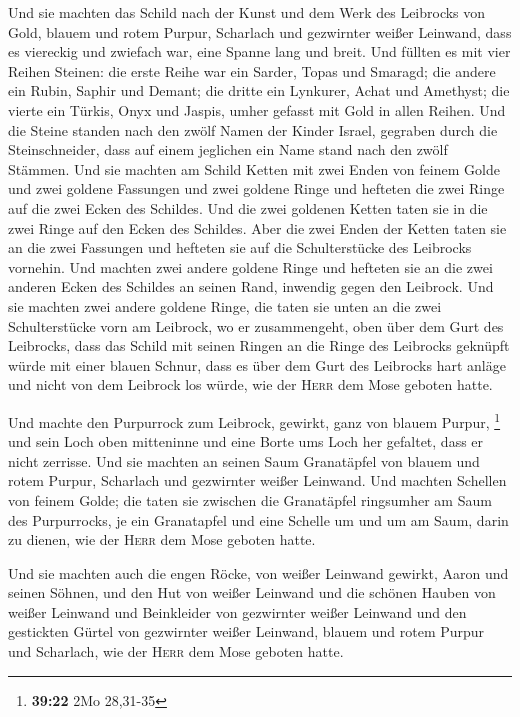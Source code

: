  Und sie machten das Schild nach der Kunst und dem Werk
des Leibrocks von Gold, blauem und rotem Purpur, Scharlach und
gezwirnter weißer Leinwand,  dass es viereckig und
zwiefach war, eine Spanne lang und breit.  Und füllten es
mit vier Reihen Steinen: die erste Reihe war ein Sarder, Topas und
Smaragd;  die andere ein Rubin, Saphir und Demant;
 die dritte ein Lynkurer, Achat und Amethyst;
 die vierte ein Türkis, Onyx und Jaspis, umher gefasst
mit Gold in allen Reihen.  Und die Steine standen nach
den zwölf Namen der Kinder Israel, gegraben durch die Steinschneider,
dass auf einem jeglichen ein Name stand nach den zwölf Stämmen.
 Und sie machten am Schild Ketten mit zwei Enden von
feinem Golde  und zwei goldene Fassungen und zwei goldene
Ringe und hefteten die zwei Ringe auf die zwei Ecken des Schildes.
 Und die zwei goldenen Ketten taten sie in die zwei Ringe
auf den Ecken des Schildes.  Aber die zwei Enden der
Ketten taten sie an die zwei Fassungen und hefteten sie auf die
Schulterstücke des Leibrocks vornehin.  Und machten zwei
andere goldene Ringe und hefteten sie an die zwei anderen Ecken des
Schildes an seinen Rand, inwendig gegen den Leibrock. 
Und sie machten zwei andere goldene Ringe, die taten sie unten an die
zwei Schulterstücke vorn am Leibrock, wo er zusammengeht, oben über dem
Gurt des Leibrocks,  dass das Schild mit seinen Ringen an
die Ringe des Leibrocks geknüpft würde mit einer blauen Schnur, dass es
über dem Gurt des Leibrocks hart anläge und nicht von dem Leibrock los
würde, wie der \textsc{Herr} dem Mose geboten hatte.

 Und machte den Purpurrock zum Leibrock, gewirkt, ganz
von blauem Purpur, \footnote{\textbf{39:22} 2Mo 28,31-35}
 und sein Loch oben mitteninne und eine Borte ums Loch
her gefaltet, dass er nicht zerrisse.  Und sie machten an
seinen Saum Granatäpfel von blauem und rotem Purpur, Scharlach und
gezwirnter weißer Leinwand.  Und machten Schellen von
feinem Golde; die taten sie zwischen die Granatäpfel ringsumher am Saum
des Purpurrocks,  je ein Granatapfel und eine Schelle um
und um am Saum, darin zu dienen, wie der \textsc{Herr} dem Mose geboten
hatte.

 Und sie machten auch die engen Röcke, von weißer
Leinwand gewirkt, Aaron und seinen Söhnen,  und den Hut
von weißer Leinwand und die schönen Hauben von weißer Leinwand und
Beinkleider von gezwirnter weißer Leinwand  und den
gestickten Gürtel von gezwirnter weißer Leinwand, blauem und rotem
Purpur und Scharlach, wie der \textsc{Herr} dem Mose geboten hatte.

